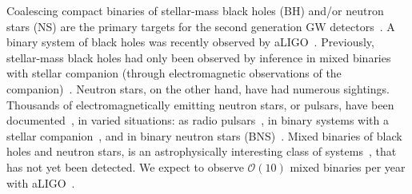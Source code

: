 \documentclass[aps,prd,amsmath,floats,floatfix, twocolumn,
superscriptaddress,nofootinbib,showpacs]{revtex4-1}
\begin{document}
Coalescing compact binaries of stellar-mass black holes (BH) and/or
neutron stars (NS) are the primary targets for the second
generation GW detectors~\cite{Timmes:1995kp,Fryer:1999mi,RevModPhys.74.1015,
2010ApJ...714.1217B,2010ApJ...715L.138B,Dominik:2014yma,Belczynski:2006zi,
2012ApJ...749...91F,
Wex:1998wt,1991ApJ...379L..17N,Mandel:2015spa,Abbott:2016nhf}.
A binary system of black holes was recently observed by 
aLIGO~\cite{LIGOVirgo2016a}. Previously, stellar-mass black holes had only 
been observed by inference in mixed binaries with stellar companion (through
electromagnetic observations of the companion)~\cite{Lewin2010,
Remillard:2006fc,Fragos:2010tm}.
Neutron stars, on the other hand, have had numerous sightings. Thousands of
electromagnetically emitting neutron stars, or pulsars, have been 
documented~\cite{Manchester:2004bp},
in varied situations: as radio pulsars~\cite{Lattimer:2012nd,Manchester:2004bp},
in binary systems with a stellar companion~\cite{1971ApJ...169L..23M,
Bond:2002eh,Lattimer:2012nd,Manchester:2004bp},
and in binary neutron stars (BNS)~\cite{Hulse:1975uf,Taylor:1982wi,
Weisberg:2010zz,Lattimer:2012nd,Manchester:2004bp}.
Mixed binaries of black holes and neutron stars, is an astrophysically
interesting class of systems~\cite{Wex:1998wt,
1991ApJ...379L..17N,Janka1999,Fryer:2015jpa}, that has not yet been detected.
We expect to observe $\mathcal{O}(10)$ mixed binaries per year with
aLIGO~\cite{Abadie:2010cf}.
\end{document}
